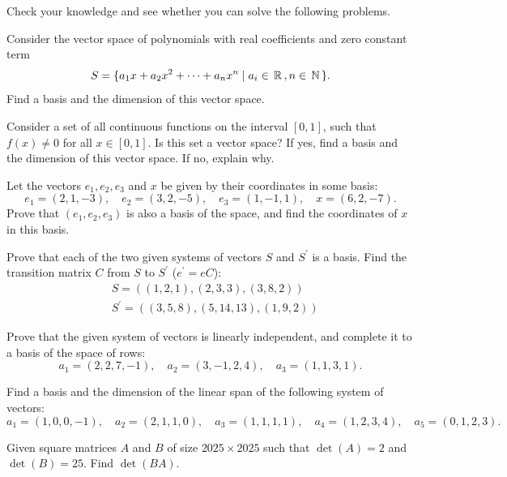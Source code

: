 Check your knowledge and see whether you can solve the following problems.

\begin{problem}
Consider the vector space of polynomials with real coefficients and zero constant term
$$
S = \{a_1 x + a_2 x^2 + \cdots + a_n x^n \mid a_i \in \,\mathbb{R}\,, n \in \,\mathbb{N}\,\}.
$$
Find a basis and the dimension of this vector space.
\end{problem}


\begin{problem}
Consider a set of all continuous functions on the interval $[0, 1]$, such that $f(x) \neq 0$ for all $x \in [0, 1]$. Is this set a vector space? If yes, find a basis and the dimension of this vector space. If no, explain why.
\end{problem}

\begin{problem}
    Let the vectors $e_1, e_2, e_3$ and $x$ be given by their coordinates in some basis:
    $$e_1=(2,1,-3), \quad e_2=(3,2,-5), \quad e_3=(1,-1,1), \quad x=(6,2,-7).$$
    Prove that $(e_1, e_2, e_3)$ is also a basis of the space, and find the coordinates of $x$ in this basis.    
\end{problem} 

\begin{problem}
    Prove that each of the two given systems of vectors $S$ and $S^{\prime}$ is a basis. Find the transition matrix $C$ from $S$ to $S^{\prime}$ ($e^{\prime} = e C$):
    $$
    \begin{aligned}
    & S=((1,2,1),(2,3,3),(3,8,2)) \\
    & S^{\prime}=((3,5,8),(5,14,13),(1,9,2))
    \end{aligned}
    $$
\end{problem}

\begin{problem}
    Prove that the given system of vectors is linearly independent, and complete it to a basis of the space of rows:
$$a_1=(2,2,7,-1), \quad a_2=(3,-1,2,4), \quad a_3=(1,1,3,1).$$
\end{problem}

\begin{problem}
    Find a basis and the dimension of the linear span of the following system of vectors:
$$a_1=(1,0,0,-1), \quad a_2=(2,1,1,0), \quad a_3=(1,1,1,1), \quad a_4=(1,2,3,4), \quad a_5=(0,1,2,3).$$
\end{problem}

\begin{problem}
 Given square matrices $A$ and $B$ of size $2025 \times 2025$ such that $\det(A) = 2$ and $\det(B) = 25$. Find $\det(BA)$.
\end{problem}

